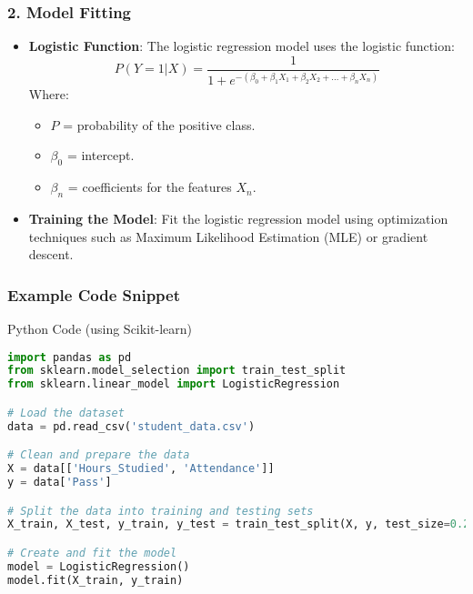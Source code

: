 \documentclass[aspectratio=169]{beamer}
\begin{document}
\begin{frame}[fragile]
    \frametitle{2. Model Fitting}
    
    \begin{itemize}
        \item \textbf{Logistic Function}: The logistic regression model uses the logistic function:
        \begin{equation}
        P(Y=1|X) = \frac{1}{1 + e^{-(\beta_0 + \beta_1X_1 + \beta_2X_2 + ... + \beta_nX_n)}}
        \end{equation}
        Where:
        \begin{itemize}
            \item $P$ = probability of the positive class.
            \item $\beta_0$ = intercept.
            \item $\beta_n$ = coefficients for the features $X_n$.
        \end{itemize}
        
        \item \textbf{Training the Model}: Fit the logistic regression model using optimization techniques such as Maximum Likelihood Estimation (MLE) or gradient descent.
    \end{itemize}
\end{frame}

\begin{frame}[fragile]
    \frametitle{Example Code Snippet}
    
    \begin{block}{Python Code (using Scikit-learn)}
    \begin{lstlisting}[language=Python]
import pandas as pd
from sklearn.model_selection import train_test_split
from sklearn.linear_model import LogisticRegression

# Load the dataset
data = pd.read_csv('student_data.csv')

# Clean and prepare the data
X = data[['Hours_Studied', 'Attendance']]
y = data['Pass']

# Split the data into training and testing sets
X_train, X_test, y_train, y_test = train_test_split(X, y, test_size=0.2, random_state=0)

# Create and fit the model
model = LogisticRegression()
model.fit(X_train, y_train)
    \end{lstlisting}
    \end{block}
\end{frame}
\end{document}
